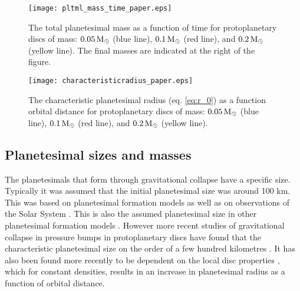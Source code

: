 \documentclass[a4paper,fleqn,usenatbib]{mnras}
\newcommand{\msun}{{\, {\rm M}_{\odot}}}
\begin{document}
\begin{figure}
\centering
\texttt{[image: pltml\_mass\_time\_paper.eps]}
\caption{The total planetesimal mass as a function of time for protoplanetary discs of mass: $0.05 \msun$ (blue line), $0.1 \msun$ (red line), and $0.2 \msun$ (yellow line). The final masses are indicated at the right of the figure.}
\label{fig:mpltml_time}
\end{figure}

\begin{figure}
\centering
\texttt{[image: characteristicradius\_paper.eps]}
\caption{The characteristic planetesimal radius (eq. \ref{eq:r_0}) as a function orbital distance for protoplanetary discs of mass: $0.05 \msun$ (blue line), $0.1 \msun$ (red line), and $0.2 \msun$ (yellow line).}
\label{fig:characteristic_radius}
\end{figure}

\subsection{Planetesimal sizes and masses}
The planetesimals that form through gravitational collapse have a specific size.
Typically it was assumed that the initial planetesimal size was around 100 km.
This was based on planetesimal formation models \citep{Youdin05,Johansen07,JohansenYoudin2009,Bai10} as well as on observations of the Solar System \citep{Morbidelli09,Delbo17}.
This is also the assumed planetesimal size in other planetesimal formation models \citep{Lenz19,Lenz20,Voelkel20}.
However more recent studies of gravitational collapse in pressure bumps in protoplanetary discs have found that the characteristic planetesimal size on the order of a few hundred kilometres \citep{Johansen12,Johansen15,Simon16,Schafer17,Simon16,Simon17,Abod19,Li19}.
It has also been found more recently to be dependent on the local disc properties \citep{Simon17,Abod19,Li19}, which for constant densities, results in an increase in planetesimal radius as a function of orbital distance.
\end{document}
